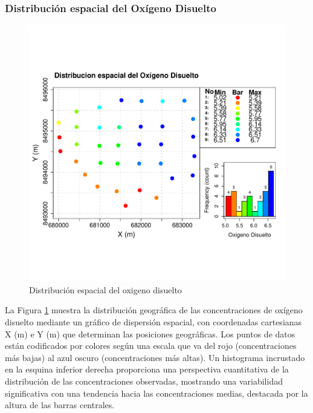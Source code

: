 \subsubsection{Distribución espacial del Oxígeno Disuelto}
\begin{figure}[H]
    \centering
    \includegraphics[width=0.8\linewidth]{Figuras_AED//VARIO_OD/od_Spatial_Distr.pdf}
    \caption{Distribución espacial del oxigeno disuelto}
    \label{fig:enter-labelCVC}
\end{figure}
La Figura \ref{fig:enter-labelCVC} muestra la distribución geográfica de las concentraciones de oxígeno disuelto mediante un gráfico de dispersión espacial, con coordenadas cartesianas X (m) e Y (m) que determinan las posiciones geográficas. Los puntos de datos están codificados por colores según una escala que va del rojo (concentraciones más bajas) al azul oscuro (concentraciones más altas). Un histograma incrustado en la esquina inferior derecha proporciona una perspectiva cuantitativa de la distribución de las concentraciones observadas, mostrando una variabilidad significativa con una tendencia hacia las concentraciones medias, destacada por la altura de las barras centrales.





